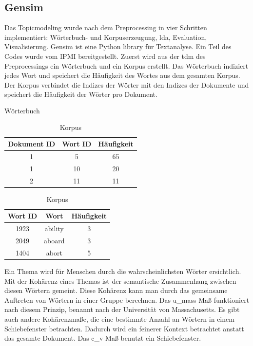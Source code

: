 \subsection{Gensim}
Das Topicmodeling wurde nach dem Preprocessing in vier Schritten implementiert: Wörterbuch- und Korpuserzeugung, \ac{lda}, Evaluation, Visualisierung. Gensim ist eine Python library für Textanalyse. Ein Teil des Codes wurde vom IPMI bereitgestellt. Zuerst wird aus der \ac{tdm} des Preprocessings ein Wörterbuch und ein Korpus erstellt. Das Wörterbuch indiziert jedes Wort und speichert die Häufigkeit des Wortes aus dem gesamten Korpus. Der Korpus verbindet die Indizes der Wörter mit den Indizes der Dokumente und speichert die Häufigkeit der Wörter pro Dokument.

\begin{table}[!htb]
	\RawFloats
	\begin{minipage}{.5\linewidth}
		\caption{Wörterbuch}
		\centering
		\begin{tabular}{|c|c|c|}
			\hline 
			Dokument ID & Wort ID & Häufigkeit \\ 
			\hline 
			1& 5 &65  \\ 
			\hline 
			1& 10 & 20 \\ 
			\hline 
			2& 11 & 11 \\ 
			\hline 
		\end{tabular} 
	\end{minipage}%
	\begin{minipage}{.5\linewidth}
		\centering
		\caption{Korpus}
		\begin{tabular}{|c|c|c|}
			\hline 
			Wort ID & Wort & Häufigkeit \\ 
			\hline 
			1923& ability & 3 \\ 
			\hline 
			2049& aboard &3  \\ 
			\hline 
			1404& abort & 5 \\ 
			\hline 
		\end{tabular} 
	\end{minipage} 
\end{table}

Ein Thema wird für Menschen durch die wahrscheinlichsten Wörter ersichtlich. \parencite[vgl.][S. 265-266]{mimno2011optimizing} Mit der Kohärenz eines Themas ist der semantische Zusammenhang zwischen diesen Wörtern gemeint. Diese Kohärenz kann man durch das gemeinsame Auftreten von Wörtern in einer Gruppe berechnen. Das u\_mass Maß funktioniert nach diesem Prinzip, benannt nach der Universität von Massachusetts. Es gibt auch andere Kohärenzmaße, die eine bestimmte Anzahl an Wörtern in einem Schiebefenster betrachten. Dadurch wird ein feinerer Kontext betrachtet anstatt das gesamte Dokument. Das c\_v Maß benutzt ein Schiebefenster. 


